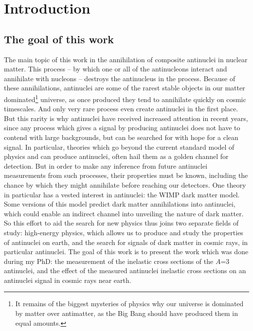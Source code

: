 \section{Introduction}

\subsection{The goal of this work}
The main topic of this work in the annihilation of composite antinuclei in nuclear matter. This process -- by which one or all of the antinucleons interact and annihilate with nucleons -- destroys the antinucleus in the process. Because of these annihilations, antinuclei are some of the rarest stable objects in our matter dominated\footnote{It remains of the biggest mysteries of physics why our universe is dominated by matter over antimatter, as the Big Bang should have produced them in equal amounts.} universe, as once produced they tend to annihilate quickly on cosmic timescales. And only very rare process even create antinuclei in the first place. \\
But this rarity is why antinuclei have received increased attention in recent years\cite{}, since any process which gives a signal by producing antinuclei does not have to contend with large backgrounds, but can be searched for with hope for a clean signal. In particular, theories which go beyond the current standard model of physics and can produce antinuclei, often hail them as a golden channel for detection. But in order to make any inference from future antinuclei measurements from such processes, their properties must be known, including the chance by which they might annihilate before reaching our detectors. One theory in particular has a vested interest in antinuclei: the WIMP dark matter model. Some versions of this model predict dark matter annihilations into antinuclei, which could enable an indirect channel into unveiling the nature of dark matter.\\

So this effort to aid the search for new physics thus joins two separate fields of study: high-energy physics, which allows us to produce and study the properties of antinuclei on earth, and the search for signals of dark matter in cosmic rays, in particular antinuclei. The goal of this work is to present the work which was done during my PhD: the measurement of the inelastic cross sections of the $A$=3 antinuclei, and the effect of the measured antinuclei inelastic cross sections on an antinuclei signal in cosmic rays near earth. 

